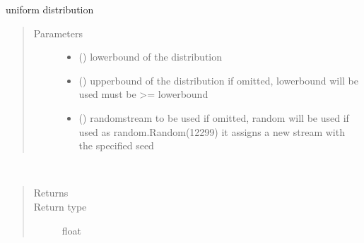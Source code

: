 \documentclass[letterpaper,10pt,english]{sphinxmanual}
\begin{document}

\begin{fulllineitems}
\label{\detokenize{Reference:salabim.Uniform}}
uniform distribution
\begin{quote}\begin{description}
\item[{Parameters}] \leavevmode\begin{itemize}
\item {} 
 () \textendash{} lowerbound of the distribution

\item {} 
 () \textendash{} upperbound of the distribution 
if omitted, lowerbound will be used 
must be \textgreater{}= lowerbound

\item {} 
 () \textendash{} randomstream to be used 
if omitted, random will be used 
if used as random.Random(12299)
it assigns a new stream with the specified seed

\end{itemize}

\end{description}\end{quote}

\begin{fulllineitems}
\label{\detokenize{Reference:salabim.Uniform.mean}}~\begin{quote}\begin{description}
\item[{Returns}] \leavevmode
{}

\item[{Return type}] \leavevmode
float

\end{description}\end{quote}

\end{fulllineitems}



\end{fulllineitems}
\end{document}
